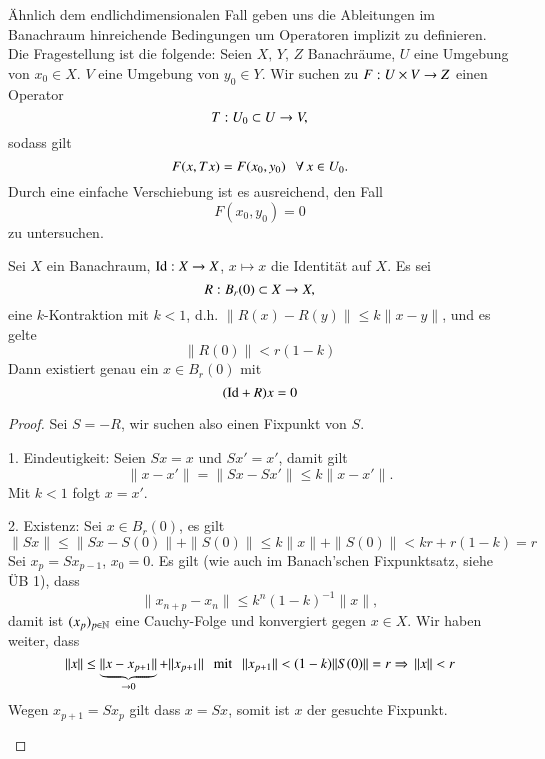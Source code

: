 Ähnlich dem endlichdimensionalen Fall geben uns die Ableitungen im Banachraum
hinreichende Bedingungen um Operatoren implizit zu definieren. Die Fragestellung ist die folgende:
Seien $X,\, Y,\, Z$ Banachräume, $U$ eine Umgebung von $x_0\in X$. $V$ eine Umgebung von $y_0\in Y$.
Wir suchen zu $F:U\times V \rightarrow Z$ einen Operator
\[
    T:U_0\subset U \rightarrow V, 
\]
sodass gilt
\[
    F(x,Tx)=F(x_0,y_0) \hspace{.25cm} \forall \, x\in U_0.
\]
Durch eine einfache Verschiebung ist es ausreichend, den Fall
\[
    F(x_0,y_0)=0
\]
zu untersuchen.

\begin{prop}
    Sei $X$ ein Banachraum, $\mathrm{Id}: X\rightarrow X$, $x\mapsto x$ die Identität auf $X$. Es sei
    \[
        R:B_r(0)\subset X \rightarrow X, 
    \]
    eine $k$-Kontraktion mit $k<1$, d.h. $\|R(x)-R(y)\|\leq k \|x-y\|$, und es gelte
    \[
        \|R(0)\| < r(1-k)
    \]
    Dann existiert genau ein $x\in B_r(0)$ mit
    \[
        (\mathrm{Id} + R)x = 0
    \]
\end{prop}

\begin{proof}
    Sei $S=-R$, wir suchen also einen Fixpunkt von $S$.
    \begin{description}
        \item{1. Eindeutigkeit:} 
        Seien $Sx=x$ und $Sx'=x'$, damit gilt
        \[
            \|x-x'\|=\|Sx-Sx'\| \leq k \|x-x'\|.
        \]
        Mit $k<1$ folgt $x=x'$.
        
        \item{2. Existenz:}
        Sei $x\in B_r(0)$, es gilt
        \[
            \|Sx\|\leq \|Sx-S(0)\|+\|S(0)\|\leq k\|x\|+\|S(0)\|< kr + r(1-k) = r
        \]
        Sei $x_p=Sx_{p-1}$, $x_0=0$. Es gilt (wie auch im Banach'schen Fixpunktsatz, siehe ÜB 1), dass
        \[
            \|x_{n+p}-x_n\| \leq k^n(1-k)^{-1}\|x\|,
        \]
        damit ist $(x_p)_{p\in \mathbb{N}}$ eine Cauchy-Folge und konvergiert gegen $x\in X$.
        Wir haben weiter, dass
        \[
            \|x\| \leq \underbrace{\|x-x_{p+1}\|}_{\rightarrow 0} + \|x_{p+1}\| \hspace{.25cm} \text{mit} 
            \hspace{.25cm} \|x_{p+1}\|< (1-k) \|S(0)\|=r\\
            \Rightarrow \, \|x\|<r
        \]
        Wegen $x_{p+1}=Sx_p$ gilt dass $x=Sx$, somit ist $x$ der gesuchte Fixpunkt. 
    \end{description}
    \[  \]
\end{proof}

